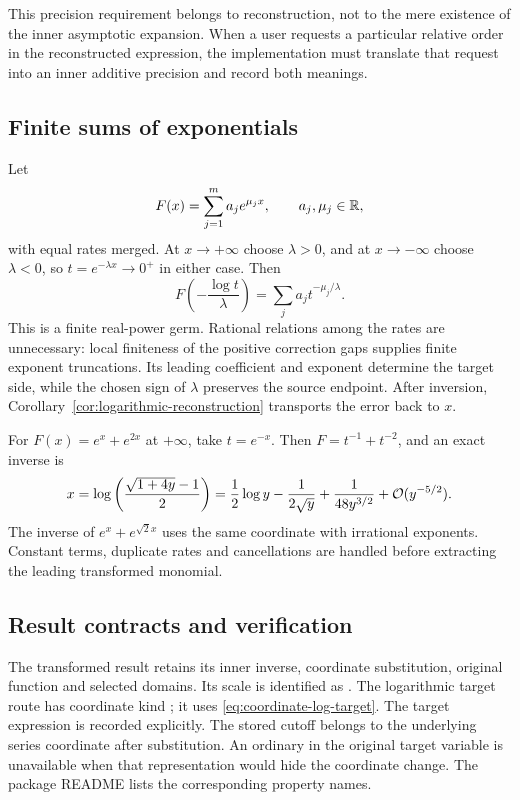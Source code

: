 This precision requirement belongs to reconstruction, not to the mere existence of the inner asymptotic expansion. When a user requests a particular relative order in the reconstructed expression, the implementation must translate that request into an inner additive precision and record both meanings.

\subsection{Finite sums of exponentials}

Let
\[
 F(x)=\sum_{j=1}^m a_j e^{\mu_j x},
 \qquad a_j,\mu_j\in\mathbb R,
\]
with equal rates merged. At $x\to+\infty$ choose $\lambda>0$, and at $x\to-\infty$ choose $\lambda<0$, so $t=e^{-\lambda x}\to0^+$ in either case. Then
\begin{equation}
 F\left(-\frac{\log t}{\lambda}\right)
 =\sum_j a_j t^{-\mu_j/\lambda}.
 \label{eq:finite-exponential-coordinate}
\end{equation}
This is a finite real-power germ. Rational relations among the rates are unnecessary: local finiteness of the positive correction gaps supplies finite exponent truncations. Its leading coefficient and exponent determine the target side, while the chosen sign of $\lambda$ preserves the source endpoint. After inversion, Corollary~\ref{cor:logarithmic-reconstruction} transports the error back to $x$.

\begin{example}
For $F(x)=e^x+e^{2x}$ at $+\infty$, take $t=e^{-x}$. Then $F=t^{-1}+t^{-2}$, and an exact inverse is
\[
 x=\log\left(\frac{\sqrt{1+4y}-1}{2}\right)
 =\frac12\log y-\frac1{2\sqrt y}
 +\frac1{48y^{3/2}}+\mathcal O(y^{-5/2}).
\]
The inverse of $e^x+e^{\sqrt2 x}$ uses the same coordinate with irrational exponents. Constant terms, duplicate rates and cancellations are handled before extracting the leading transformed monomial.
\end{example}

\subsection{Result contracts and verification}

The transformed result retains its inner inverse, coordinate substitution, original function and selected domains. Its scale is identified as . The logarithmic target route has coordinate kind ; it uses \eqref{eq:coordinate-log-target}. The target expression is recorded explicitly. The stored cutoff belongs to the underlying series coordinate after substitution. An ordinary  in the original target variable is unavailable when that representation would hide the coordinate change. The package README lists the corresponding property names.

